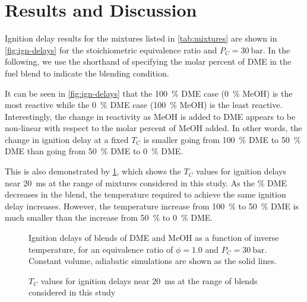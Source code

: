 \documentclass[12pt]{../ussci}
\begin{document}
\section{Results and Discussion}\label{sec:results-and-discussion}

Ignition delay results for the mixtures listed in \cref{tab:mixtures} are shown
in \cref{fig:ign-delays} for the stoichiometric equivalence ratio and \(P_C =
\SI[number-unit-product={\ }]{30}{\bar}\). In the following, we use the
shorthand of specifying the molar percent of DME in the fuel blend to indicate
the blending condition.

It can be seen in \cref{fig:ign-delays} that the \SI{100}{\percent} DME case
(\SI{0}{\percent} MeOH) is the most reactive while the \SI{0}{\percent} DME case
(\SI{100}{\percent} MeOH) is the least reactive. Interestingly, the change in
reactivity as MeOH is added to DME appears to be non-linear with respect to the
molar percent of MeOH added. In other words, the change in ignition delay at a
fixed \(T_C\) is smaller going from \SI{100}{\percent} DME to \SI{50}{\percent}
DME than going from \SI{50}{\percent} DME to \SI{0}{\percent} DME.

This is also demonstrated by \cref{fig:temp-comp}, which shows the \(T_C\)
values for ignition delays near \SI{20}{\ms} at the range of mixtures considered
in this study. As the \si{\percent} DME decreases in the blend, the temperature
required to achieve the same ignition delay increases. However, the temperature
increase from \SI{100}{\percent} to \SI{50}{\percent} DME is much smaller than
the increase from \SI{50}{\percent} to \SI{0}{\percent} DME.

\begin{figure}[htb]
    \begin{minipage}[t]{0.48\textwidth}
        \centering
        \resizebox{\linewidth}{!}{}
        \caption{Ignition delays of blends of DME and MeOH as a function of
        inverse temperature, for an equivalence ratio of \(\phi = 1.0\) and
        \(P_C = \SI[number-unit-product={\ }]{30}{\bar}\). Constant volume,
        adiabatic simulations are shown as the solid lines.}
        \label{fig:ign-delays}
    \end{minipage}\hfill%
    \begin{minipage}[t]{0.48\textwidth}
        \centering
        \resizebox{\linewidth}{!}{}
        \caption{\(T_C\) values for ignition delays near \SI{20}{\ms} at the
        range of blends considered in this study}
        \label{fig:temp-comp}
    \end{minipage}\hfill%
\end{figure}
\end{document}
